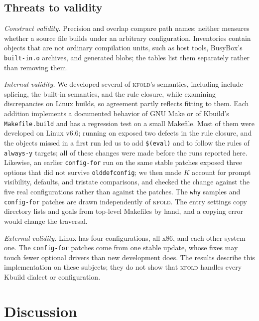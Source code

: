 \documentclass[acmsmall,screen,review]{acmart}
\newcommand{\tool}{\textsc{kfold}\xspace}
\begin{document}
\subsection{Threats to validity}
\label{sec:eval:threats}
\emph{Construct validity.} Precision and overlap compare path names; neither measures whether a source file builds under an arbitrary configuration. Inventories contain objects that are not ordinary compilation units, such as host tools, BusyBox's \texttt{built-in.o} archives, and generated blobs; the tables list them separately rather than removing them.

\emph{Internal validity.} We developed several of \tool's semantics, including include splicing, the built-in semantics, and the rule closure, while examining discrepancies on Linux builds, so agreement partly reflects fitting to them. Each addition implements a documented behavior of GNU Make or of Kbuild's \texttt{Makefile.build} and has a regression test on a small Makefile. Most of them were developed on Linux v6.6; running on \NLinuxVersion exposed two defects in the rule closure, and the objects missed in a first run led us to add \texttt{\$(eval)} and to follow the rules of \texttt{always-y} targets; all of these changes were made before the runs reported here. Likewise, an earlier \texttt{config-for} run on the same stable patches exposed three options that did not survive \texttt{olddefconfig}; we then made $K$ account for prompt visibility, defaults, and tristate comparisons, and checked the change against the five real configurations rather than against the patches. The \texttt{why} samples and \texttt{config-for} patches are drawn independently of \tool. The entry settings copy directory lists and goals from top-level Makefiles by hand, and a copying error would change the traversal.

\emph{External validity.} Linux has four configurations, all x86, and each other system one. The \texttt{config-for} patches come from one stable update, whose fixes may touch fewer optional drivers than new development does. The results describe this implementation on these subjects; they do not show that \tool handles every Kbuild dialect or configuration.

\section{Discussion}
\label{sec:discussion}
\end{document}
